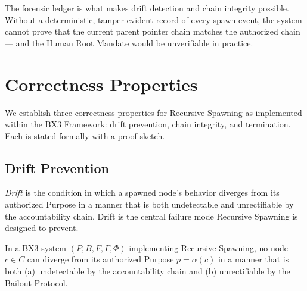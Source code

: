 The forensic ledger is what makes drift detection and chain integrity possible. Without a deterministic, tamper-evident record of every spawn event, the system cannot prove that the current parent pointer chain matches the authorized chain — and the Human Root Mandate would be unverifiable in practice.

\section{Correctness Properties}
\label{sec:correctness}

We establish three correctness properties for Recursive Spawning as implemented within the BX3 Framework: drift prevention, chain integrity, and termination. Each is stated formally with a proof sketch.

\subsection{Drift Prevention}
\label{sec:drift-prevention}

\textit{Drift} is the condition in which a spawned node's behavior diverges from its authorized Purpose in a manner that is both undetectable and unrectifiable by the accountability chain. Drift is the central failure mode Recursive Spawning is designed to prevent.

\begin{thrm}
\label{thrm:drift-prevention}
In a BX3 system $(P, B, F, \Gamma, \Phi)$ implementing Recursive Spawning, no node $c \in C$ can diverge from its authorized Purpose $p = \alpha(c)$ in a manner that is both (a) undetectable by the accountability chain and (b) unrectifiable by the Bailout Protocol.
\end{thrm}

